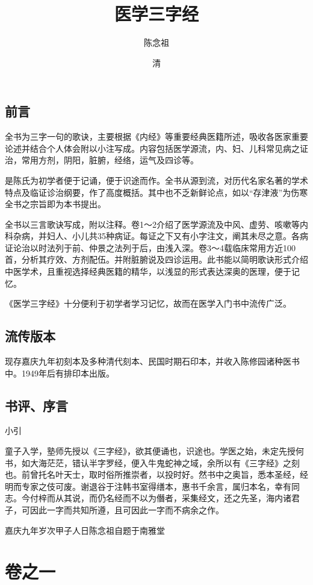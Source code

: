 \documentclass[a4paper,12pt,UTF8,twoside]{ctexbook}
\title{\heiti\zihao{0} 医学三字经}
\author{陈念祖}
\date{清}
\begin{document}
	
	\maketitle
	\tableofcontents
	
	\frontmatter
	\chapter{前言}
	全书为三字一句的歌诀，主要根据《内经》等重要经典医籍所述，吸收各医家重要论述并结合个人体会附以小注写成。内容包括医学源流，内、妇、儿科常见病之证治，常用方剂，阴阳，脏腑，经络，运气及四诊等。
	
	是陈氏为初学者便于记诵，便于识途而作。全书从源到流，对历代名家名著的学术特点及临证诊治纲要，作了高度概括。其中也不乏新鲜论点，如以“存津液”为伤寒全书之宗旨即为本书提出。
	
	全书以三言歌诀写成，附以注释。卷1～2介绍了医学源流及中风、虚劳、咳嗽等内科杂病，并妇人、小儿共35种病证。每证之下又有小字注文，阐其未尽之意。各病证论治以时法列于前、仲景之法列于后，由浅入深。卷3～4载临床常用方近100首，分析其疗效、方剂配伍。并附脏腑说及四诊运用。此书能以简明歌诀形式介绍中医学术，且重视选择经典医籍的精华，以浅显的形式表达深奥的医理，便于记忆。

	《医学三字经》十分便利于初学者学习记忆，故而在医学入门书中流传广泛。
	
	\chapter{流传版本}
	现存嘉庆九年初刻本及多种清代刻本、民国时期石印本，并收入陈修园诸种医书中。1949年后有排印本出版。
	
	\chapter{书评、序言}
	小引
	
	童子入学，塾师先授以《三字经》，欲其便诵也，识途也。学医之始，未定先授何书，如大海茫茫，错认半字罗经，便入牛鬼蛇神之域，余所以有《三字经》之刻也。前曾托名叶天士，取时俗所推崇者，以投时好。然书中之奥旨，悉本圣经，经明而专家之伎可废。谢退谷于注韩书室得缮本，惠书千余言，属归本名，幸有同志。今付梓而从其说，而仍名经而不以为僭者，采集经文，还之先圣，海内诸君子，可因此一字而共知所遵，且可因此一字而不病余之作。
	
	嘉庆九年岁次甲子人日陈念祖自题于南雅堂

    \mainmatter
	\part{卷之一}
\end{document}
